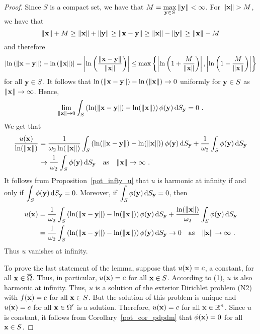 \begin{proof}
Since $S$ is a compact set, we have that
$\displaystyle M = \max_{\mathbf{y} \in S} \|\mathbf{y}\| < \infty$.
For $\|\mathbf{x}\| > M$, we have that
\[
\|\mathbf{x}\| + M \geq \|\mathbf{x}\| + \|\mathbf{y}\| \geq \|\mathbf{x} - \mathbf{y} \|
\geq \|\mathbf{x}\| - \|\mathbf{y}\|
\geq \|\mathbf{x}\| - M
\]
and therefore
\[
\left| \ln\left(\|\mathbf{x}-\mathbf{y}\|\right) -
\ln\left(\|\mathbf{x}\|\right) \right|
= \left| \ln\left(\frac{\|\mathbf{x}-\mathbf{y}\|}{\|\mathbf{x}\|}\right) \right|
\leq \max \left\{
\left| \ln\left(1 + \frac{M}{\|\mathbf{x}\|}\right) \right|,
\left| \ln\left(1 - \frac{M}{\|\mathbf{x}\|}\right) \right| \right\}
\]
for all $\mathbf{y} \in S$.   It follows that
$\ln\left(\|\mathbf{x}-\mathbf{y}\|\right) - \ln\left(\|\mathbf{x}\|\right) \to 0$
uniformly for $\mathbf{y} \in S$ as $\|\mathbf{x}\| \to \infty$.
Hence,
\[
\lim_{\|\mathbf{x}\|\to 0} \int_S \left( \ln(\|\mathbf{x}-\mathbf{y}\|) - \ln(\|\mathbf{x}\|)
\right) \phi(\mathbf{y}) \,\mathrm{d}{S}_{\mathbf{y}} = 0 \ .
\]
We get that
\begin{align*}
\frac{u(\mathbf{x})}{\ln(\|\mathbf{x}\|)}
&= \frac{1}{\omega_2 \ln(\|\mathbf{x}\|)}
\int_S \left( \ln(\|\mathbf{x}-\mathbf{y}\|) - \ln(\|\mathbf{x}\|)
\right) \phi(\mathbf{y}) \,\mathrm{d}{S}_{\mathbf{y}}
+ \frac{1}{\omega_2} \int_S \phi(\mathbf{y}) \,\mathrm{d}{S}_{\mathbf{y}} \\
&\to \frac{1}{\omega_2} \int_S \phi(\mathbf{y}) \,\mathrm{d}{S}_{\mathbf{y}}
\quad \text{as} \quad \|\mathbf{x}\| \to \infty \ .
\end{align*}
It follows from Proposition~\ref{pot_infty_u} that $u$ is harmonic at
infinity if and only if
$\displaystyle \int_S \phi(\mathbf{y}) \,\mathrm{d}{S}_{\mathbf{y}} = 0$.
Moreover, if $\displaystyle \int_S \phi(\mathbf{y}) \,\mathrm{d}{S}_{\mathbf{y}} = 0$, then
\begin{align*}
u(\mathbf{x})
&= \frac{1}{\omega_2}
\int_S \left( \ln(\|\mathbf{x}-\mathbf{y}\|) - \ln(\|\mathbf{x}\|)
\right) \phi(\mathbf{y}) \,\mathrm{d}{S}_{\mathbf{y}}
+ \frac{\ln(\|\mathbf{x}\|)}{\omega_2} \int_S \phi(\mathbf{y}) \,\mathrm{d}{S}_{\mathbf{y}} \\
&= \frac{1}{\omega_2}
\int_S \left( \ln(\|\mathbf{x}-\mathbf{y}\|) - \ln(\|\mathbf{x}\|)
\right) \phi(\mathbf{y}) \,\mathrm{d}{S}_{\mathbf{y}}
\to 0 \quad \text{as} \quad \|\mathbf{x}\| \to \infty \ .
\end{align*}
Thus $u$ vanishes at infinity.

To prove the last statement of the lemma, suppose that
$u(\mathbf{x}) = c$, a constant, for all $\mathbf{x} \in \overline{\Omega}$.
Thus, in particular, $u(\mathbf{x}) = c$ for all $\mathbf{x} \in S$.
According to (1), $u$ is also harmonic at infinity.  Thus, $u$ is a
solution of the exterior Dirichlet problem (N2) with $f(\mathbf{x}) = c$
for all $\mathbf{x} \in S$.   But the solution of this problem is
unique and $u(\mathbf{x}) = c$ for all
$\displaystyle \mathbf{x} \in \Omega^{\prime}$ is a
solution.  Therefore, $u(\mathbf{x}) = c$ for all
$\displaystyle \mathbf{x} \in \mathbb{R}^n$.
Since $u$ is constant, it follows from Corollary~\ref{pot_cor_pdpdm}
that $\phi(\mathbf{x}) = 0$ for all $\mathbf{x} \in S$.
\end{proof}

